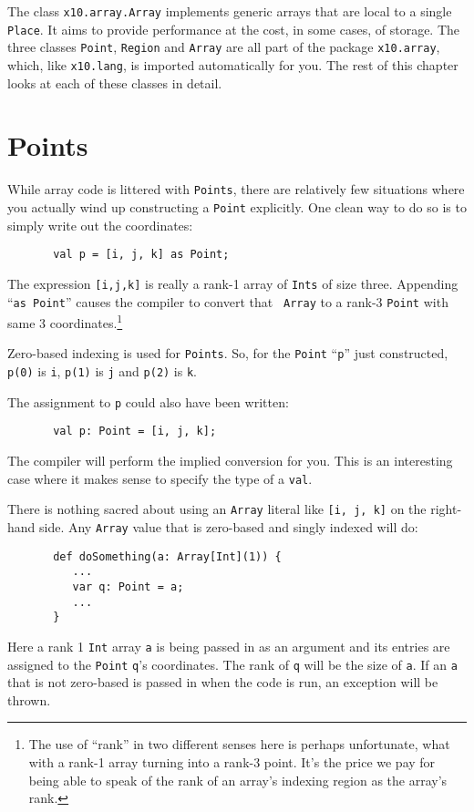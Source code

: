 The class {\tt x10.array.Ar\-ray} implements generic arrays that are local to a
single {\tt Place}. It aims to provide performance at the cost, in some cases,
of storage. The three classes {\tt Point}, {\tt Region} and  {\tt Array} are
all part of the package {\tt x10.array}, which, like {\tt x10.lang}, is
imported automatically for you.  The rest of this chapter looks at each of
these classes in detail.

\section{Points}\label{sec:points}

While array code is littered with {\tt Points}, there are relatively few
situations where you actually wind up constructing a {\tt Point} explicitly. 
One clean way to do so is to simply write out the coordinates:
\begin{verbatim}
       val p = [i, j, k] as Point;
\end{verbatim}
The expression {\tt [i,j,k]} is really a rank-1 array of {\tt Ints} of size
three.  Appending ``{\tt as Point}'' causes the compiler to convert that {\tt
Array} to a rank-3 {\tt Point} with same 3 coordinates.\footnote{The use of
``rank'' in two different senses here is perhaps unfortunate, what with a
rank-1 array turning into a rank-3 point. It's the price we pay for being able
to speak of the rank of an array's indexing region as the array's rank.}
 
Zero-based indexing is used for {\tt Points}.  So, for the {\tt Point} ``{\tt p}''
just constructed, {\tt p(0)} is {\tt i}, {\tt p(1)} is {\tt j} and {\tt p(2)} is
{\tt k}.

The assignment to {\tt p} could also have been written:
\begin{verbatim}
       val p: Point = [i, j, k];
\end{verbatim}
The compiler will perform the implied conversion for you.  This is an
interesting case where it makes sense to specify the type of a {\tt val}.

There is nothing sacred about using an {\tt Array} literal like {\tt [i, j,
k]} on the right-hand side. Any {\tt Array} value that is zero-based and singly
indexed will do:
\begin{verbatim}
       def doSomething(a: Array[Int](1)) {
          ... 
          var q: Point = a;
          ...
       }         
\end{verbatim}
Here a rank 1 {\tt Int} array {\tt a} is being passed in 
as an argument and  
its entries are assigned to the  {\tt Point} {\tt q}'s coordinates.
The rank of {\tt q} will be the size of {\tt a}.   If an {\tt a} that
is not zero-based
is passed in when the code is run, an exception will be thrown.

